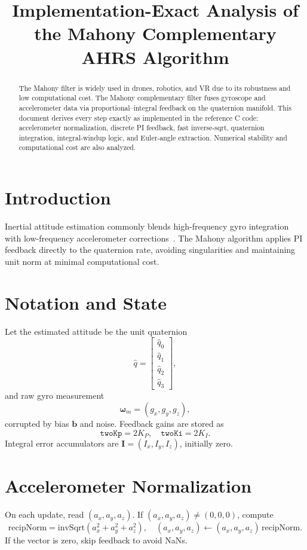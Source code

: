 \documentclass[12pt,letterpaper]{article}
\title{Implementation-Exact Analysis of the Mahony Complementary AHRS Algorithm}
\date{}
\begin{document}
\maketitle

\begin{abstract}
The Mahony filter is widely used in drones, robotics, and VR due to its robustness and low computational cost. The Mahony complementary filter fuses gyroscope and accelerometer data via proportional–integral feedback on the quaternion manifold.  This document derives every step exactly as implemented in the reference C code: accelerometer normalization, discrete PI feedback, fast inverse‐sqrt, quaternion integration, integral‐windup logic, and Euler‐angle extraction.  Numerical stability and computational cost are also analyzed.
\end{abstract}

\section{Introduction}
Inertial attitude estimation commonly blends high-frequency gyro integration with low-frequency accelerometer corrections~\cite{Mahony2008}.  The Mahony algorithm applies PI feedback directly to the quaternion rate, avoiding singularities and maintaining unit norm at minimal computational cost.

\section{Notation and State}
Let the estimated attitude be the unit quaternion 
\[
\hat q = \begin{bmatrix}\hat q_0\\\hat q_1\\\hat q_2\\\hat q_3\end{bmatrix},
\]
and raw gyro measurement 
\[
\boldsymbol\omega_m = (g_x,g_y,g_z),
\]
corrupted by bias $\mathbf b$ and noise.  Feedback gains are stored as 
\[
\texttt{twoKp} = 2K_P,\quad \texttt{twoKi} = 2K_I.
\]
Integral error accumulators are 
\(\mathbf I=(I_x,I_y,I_z)\), initially zero.

\section{Accelerometer Normalization}
On each update, read $(a_x,a_y,a_z)$.  If $(a_x,a_y,a_z)\neq(0,0,0)$, compute
\[
\text{recipNorm} = \mathrm{invSqrt}(a_x^2+a_y^2+a_z^2),
\quad
(a_x,a_y,a_z)\leftarrow (a_x,a_y,a_z)\,\text{recipNorm}.
\]
If the vector is zero, skip feedback to avoid NaNs.
\end{document}
